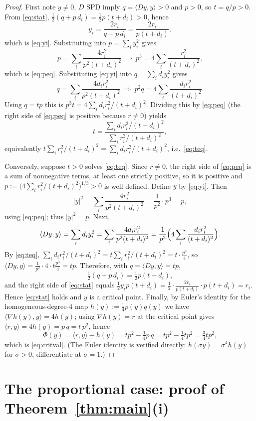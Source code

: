 \documentclass{amsart}
\theoremstyle{definition}
\begin{document}
\begin{proof}
First note $y\ne 0$, $D$ SPD imply $q=\langle Dy,y\rangle>0$ and $p>0$, so $t=q/p>0$. From \eqref{eq:stat}, $\tfrac12(q+p\,d_i)=\tfrac12 p(t+d_i)>0$, hence
\[
y_i=\frac{2r_i}{q+p\,d_i}=\frac{2r_i}{p(t+d_i)},
\]
which is \eqref{eq:yi}. Substituting into $p=\sum_i y_i^2$ gives
\[
p=\sum_i\frac{4r_i^2}{p^2(t+d_i)^2}\ \Longrightarrow\ p^3=4\sum_i\frac{r_i^2}{(t+d_i)^2},
\]
which is \eqref{eq:peq}. Substituting \eqref{eq:yi} into $q=\sum_i d_i y_i^2$ gives
\[
q=\sum_i\frac{4d_i r_i^2}{p^2(t+d_i)^2}\ \Longrightarrow\ p^2 q=4\sum_i\frac{d_i r_i^2}{(t+d_i)^2}.
\]
Using $q=tp$ this is $p^3 t=4\sum_i d_i r_i^2/(t+d_i)^2$. Dividing this by \eqref{eq:peq} (the right side of \eqref{eq:peq} is positive because $r\ne0$) yields
\[
t=\frac{\sum_i d_i r_i^2/(t+d_i)^2}{\sum_i r_i^2/(t+d_i)^2},
\]
equivalently $t\sum_i r_i^2/(t+d_i)^2=\sum_i d_i r_i^2/(t+d_i)^2$, i.e.\ \eqref{eq:teq}.

Conversely, suppose $t>0$ solves \eqref{eq:teq}. Since $r\ne 0$, the right side of \eqref{eq:peq} is a sum of nonnegative terms, at least one strictly positive, so it is positive and $p:=\bigl(4\sum_i r_i^2/(t+d_i)^2\bigr)^{1/3}>0$ is well defined. Define $y$ by \eqref{eq:yi}. Then
\[
|y|^2=\sum_i\frac{4r_i^2}{p^2(t+d_i)^2}=\frac{1}{p^2}\cdot p^3=p,
\]
using \eqref{eq:peq}; thus $|y|^2=p$. Next,
\[
\langle Dy,y\rangle=\sum_i d_i y_i^2=\sum_i\frac{4d_i r_i^2}{p^2(t+d_i)^2}
=\frac{1}{p^2}\Bigl(4\sum_i\frac{d_i r_i^2}{(t+d_i)^2}\Bigr).
\]
By \eqref{eq:teq}, $\sum_i d_i r_i^2/(t+d_i)^2=t\sum_i r_i^2/(t+d_i)^2=t\cdot\tfrac{p^3}{4}$, so $\langle Dy,y\rangle=\frac{1}{p^2}\cdot 4\cdot t\tfrac{p^3}{4}=tp$. Therefore, with $q=\langle Dy,y\rangle=tp$,
\[
\tfrac12(q+p\,d_i)=\tfrac12 p(t+d_i),
\]
and the right side of \eqref{eq:stat} equals $\tfrac12 y_i p(t+d_i)=\tfrac12\cdot\frac{2r_i}{p(t+d_i)}\cdot p(t+d_i)=r_i$. Hence \eqref{eq:stat} holds and $y$ is a critical point. Finally, by Euler's identity for the homogeneous-degree-$4$ map $h(y):=\tfrac14 p(y)q(y)$ we have $\langle\nabla h(y),y\rangle=4h(y)$; using $\nabla h(y)=r$ at the critical point gives $\langle r,y\rangle=4h(y)=p\,q=t\,p^2$, hence
\[
\Phi(y)=\langle r,y\rangle-h(y)=t p^2-\tfrac14 p\,q=t p^2-\tfrac14 t p^2=\tfrac34 t p^2,
\]
which is \eqref{eq:critval}. (The Euler identity is verified directly: $h(\sigma y)=\sigma^4 h(y)$ for $\sigma>0$, differentiate at $\sigma=1$.)
\end{proof}

\section{The proportional case: proof of Theorem~\ref{thm:main}(i)}\label{sec:prop}
\end{document}
